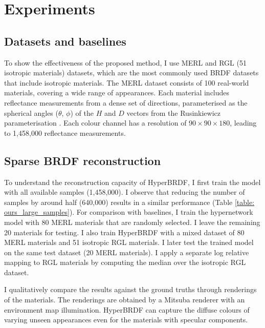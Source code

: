 \section{Experiments}\label{sec:exp}


\subsection{Datasets and baselines}

To show the effectiveness of the proposed method, I use MERL \cite{Matusik2003jul} and RGL (51 isotropic materials) \cite{dupuy2018adaptive} datasets, which are the most commonly used \gls{BRDF} datasets that include isotropic materials. The MERL dataset \cite{Matusik2003jul} consists of 100 real-world materials, covering a wide range of appearances. Each material includes reflectance measurements from a dense set of directions, parameterised as the spherical angles ($\theta$, $\phi$) of the $H$ and $D$ vectors from the Rusinkiewicz parameterisation \cite{rusinkiewicz1998new}. Each colour channel has a resolution of $90 \times 90 \times 180$, leading to 1,458,000 reflectance measurements. 



\subsection{Sparse BRDF reconstruction}\label{sec:brdf_rec}

To understand the reconstruction capacity of HyperBRDF, I first train the model with all available samples (1,458,000). I observe that reducing the number of samples by around half (640,000) results in a similar performance (Table \ref{table: ours_large_samples}). For comparison with baselines, I train the hypernetwork model with 80 MERL materials that are randomly selected. I leave the remaining 20 materials for testing. I also train HyperBRDF with a mixed dataset of 80 MERL materials and 51 isotropic RGL materials. I later test the trained model on the same test dataset (20 MERL materials). I apply a separate log relative mapping to RGL materials by computing the median over the isotropic RGL dataset.
 
I qualitatively compare the results against the ground truths through renderings of the materials. The renderings are obtained by a Mitsuba renderer with an environment map illumination. HyperBRDF can capture the diffuse colours of varying unseen appearances even for the materials with specular components. 


